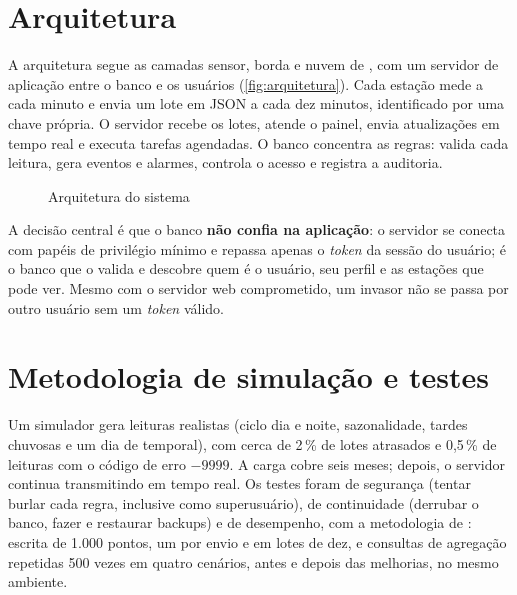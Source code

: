 \section{Arquitetura}

A arquitetura segue as camadas sensor, borda e nuvem de \textcite{grzesik2020}, com um servidor de aplicação entre o banco e os usuários (\autoref{fig:arquitetura}). Cada estação mede a cada minuto e envia um lote em JSON a cada dez minutos, identificado por uma chave própria. O servidor recebe os lotes, atende o painel, envia atualizações em tempo real e executa tarefas agendadas. O banco concentra as regras: valida cada leitura, gera eventos e alarmes, controla o acesso e registra a auditoria.

\begin{figure}[htb]
  \caption{Arquitetura do sistema}\label{fig:arquitetura}
  \centering
  \resizebox{0.92\textwidth}{!}{}
\end{figure}

A decisão central é que o banco \textbf{não confia na aplicação}: o servidor se conecta com papéis de privilégio mínimo e repassa apenas o \textit{token} da sessão do usuário; é o banco que o valida e descobre quem é o usuário, seu perfil e as estações que pode ver. Mesmo com o servidor web comprometido, um invasor não se passa por outro usuário sem um \textit{token} válido.

\section{Metodologia de simulação e testes}

Um simulador gera leituras realistas (ciclo dia e noite, sazonalidade, tardes chuvosas e um dia de temporal), com cerca de 2\,\% de lotes atrasados e 0,5\,\% de leituras com o código de erro $-9999$. A carga cobre seis meses; depois, o servidor continua transmitindo em tempo real. Os testes foram de segurança (tentar burlar cada regra, inclusive como superusuário), de continuidade (derrubar o banco, fazer e restaurar backups) e de desempenho, com a metodologia de \textcite{grzesik2020}: escrita de 1.000 pontos, um por envio e em lotes de dez, e consultas de agregação repetidas 500 vezes em quatro cenários, antes e depois das melhorias, no mesmo ambiente.
